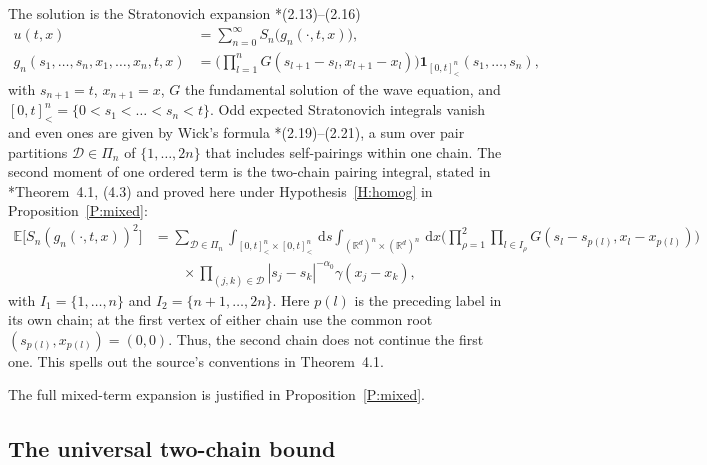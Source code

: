 \documentclass[12pt]{article}
\numberwithin{equation}{section}
\theoremstyle{definition}
\newcommand{\R}{\mathbb{R}}
\newcommand{\E}{\mathbb{E}}
\newcommand{\ud}{\,\mathrm{d}}
\begin{document}
The solution is the Stratonovich expansion
\cite{chen:author2026:time-dependency}*{(2.13)--(2.16)}
\begin{equation}\label{E:expansion}
  \begin{split}
    u(t,x)&=\sum_{n=0}^\infty S_n\big(g_n(\cdot,t,x)\big),\\
    g_n(s_1,\dots,s_n,x_1,\dots,x_n,t,x)
    &=\Big(\prod_{l=1}^nG(s_{l+1}-s_l,x_{l+1}-x_l)\Big)
    \mathbf 1_{[0,t]^n_<}(s_1,\dots,s_n),
  \end{split}
\end{equation}
with $s_{n+1}=t$, $x_{n+1}=x$, $G$ the fundamental solution of the wave
equation, and $[0,t]^n_<=\{0<s_1<\dots<s_n<t\}$. Odd expected Stratonovich
integrals vanish and even ones are given by Wick's formula
\cite{chen:author2026:time-dependency}*{(2.19)--(2.21)}, a sum over pair
partitions $\mathcal D\in\Pi_n$ of $\{1,\dots,2n\}$ that includes
self-pairings within one chain. The second moment of one ordered term is
the two-chain pairing integral, stated in
\cite{chen:author2026:time-dependency}*{Theorem~4.1, (4.3)} and proved
here under Hypothesis~\ref{H:homog} in Proposition~\ref{P:mixed}:
\begin{equation}\label{E:Sn2}
  \begin{split}
    \E\big[S_n(g_n(\cdot,t,x))^2\big]
    &=\sum_{\mathcal D\in\Pi_n}\int_{[0,t]^n_<\times[0,t]^n_<}\ud s
    \int_{(\R^d)^n\times(\R^d)^n}\ud x
    \Big(\prod_{\rho=1}^2\prod_{l\in I_\rho}
    G(s_l-s_{p(l)},x_l-x_{p(l)})\Big)\\
    &\qquad\times\prod_{(j,k)\in\mathcal D}|s_j-s_k|^{-\alpha_0}\gamma(x_j-x_k),
  \end{split}
\end{equation}
with $I_1=\{1,\dots,n\}$ and $I_2=\{n+1,\dots,2n\}$.
Here $p(l)$ is the preceding label in its own chain; at the first vertex
of either chain use the common root $(s_{p(l)},x_{p(l)})=(0,0)$.
Thus, the second chain does not continue the first one. This spells out
the source's conventions in Theorem~4.1.

The full mixed-term expansion is justified in Proposition~\ref{P:mixed}.

\subsection{The universal two-chain bound}
\end{document}
